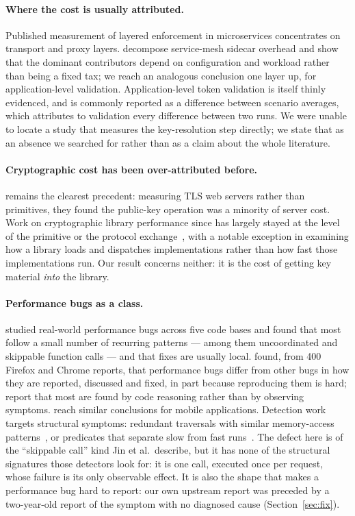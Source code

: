 \documentclass[pdflatex,sn-basic,twocolumn]{sn-jnl}%
\begin{document}
\paragraph{Where the cost is usually attributed.} Published measurement of
layered enforcement in microservices concentrates on transport and proxy
layers. \citet{zhu2023dissecting} decompose service-mesh sidecar
overhead and show that the dominant contributors depend on configuration and
workload rather than being a fixed tax; we reach an analogous conclusion one
layer up, for application-level validation. Application-level token validation
is itself thinly evidenced, and is commonly reported as a difference between
scenario averages, which attributes to validation every difference between two
runs. We were unable to locate a study that measures the key-resolution step
directly;
we state that as an absence we searched for rather than as a claim about the
whole literature.

\paragraph{Cryptographic cost has been over-attributed before.} \citet{coarfa2006performance} remains the clearest precedent: measuring TLS
web servers rather than primitives, they found the public-key operation was a
minority of server cost. Work on cryptographic library performance since has
largely stayed at the level of the primitive or the protocol
exchange~\citep{naser2020performance,sikeridis2020assessing}, with \citet{tuveri2019engines} a notable exception in examining how a library
loads and dispatches implementations rather than how fast those
implementations run. Our result concerns neither: it is the cost of getting key
material \emph{into} the library.

\paragraph{Performance bugs as a class.} \citet{jin2012understanding} studied real-world performance bugs across five
code bases and found that most follow a small number of recurring patterns ---
among them uncoordinated and skippable function calls --- and that fixes are
usually local. \citet{zaman2012qualitative} found, from 400
Firefox and Chrome reports, that performance bugs differ from other bugs in
how they are reported, discussed and fixed, in part because reproducing them
is hard; \citet{nistor2013discovering} report that most are found
by code reasoning rather than by observing symptoms. \citet{liu2014characterizing} reach similar conclusions for mobile
applications. Detection work targets structural symptoms: redundant traversals
with similar memory-access patterns~\citep{nistor2013toddler}, or predicates
that separate slow from fast runs~\citep{song2014statistical}. The defect here
is of the ``skippable call'' kind Jin et al.\ describe, but it has none of the
structural signatures those detectors look for: it is one call, executed once
per request, whose failure is its only observable effect. It is also the shape
that makes a performance bug hard to report: our own upstream report was
preceded by a two-year-old report of the symptom with no diagnosed cause
(Section~\ref{sec:fix}).
\end{document}
